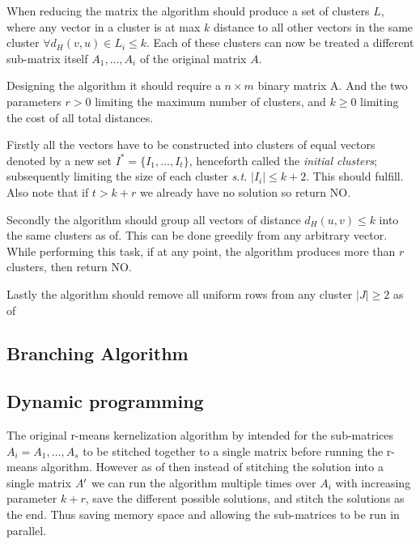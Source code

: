 \documentclass[a4paper]{article}
\begin{document}
When reducing the matrix the algorithm should produce a set of clusters $L$, where any vector in a cluster is at max $k$ distance to all
other vectors in the same cluster $\forall d_H(v, u) \in L_i \leq k$. Each of these clusters can now be treated a 
different sub-matrix itself $A_1, \dots, A_i$ of the original matrix $A$.

Designing the algorithm it should require a $n \times m$ binary matrix A. And the two parameters $r > 0$ limiting the
maximum number of clusters, and $k \geq 0$ limiting the cost of all total distances.

Firstly all the vectors have to be constructed into clusters of equal vectors denoted by a new set $I^* = \{I_1, \dots, I_t\}$, henceforth 
called the \textit{initial clusters}; subsequently limiting the size of each cluster \textit{s.t.} $|I_i| \leq k+2$. This should
fulfill. Also note that if $t > k+r$ we
already have no solution so return NO.

Secondly the algorithm should group all vectors of distance $d_H(u,v) \leq k$ into the same clusters as of. This can be done greedily from any
arbitrary vector. While performing this task, if at any point, the algorithm produces more than $r$ clusters, then return NO.

Lastly the algorithm should remove all uniform rows from any cluster $|J| \geq 2$ as of


\subsection{Branching Algorithm}


\subsection{Dynamic programming}
The original r-means kernelization algorithm by \cite{fomin_golovach_panolan_2020}
intended for the sub-matrices $A_i=A_1,\dots,A_s$ to be stitched together to a single
matrix before running the r-means algorithm. However as of \cite[Lemma 5]{fomin_golovach_panolan_2020}
then instead of stitching the solution into a single matrix $A\sp{\prime}$
we can run the algorithm multiple times over $A_i$ with increasing parameter $k+r$,
save the different possible solutions, and stitch the solutions as the end. Thus saving
memory space and allowing the sub-matrices to be run in parallel.
\end{document}
